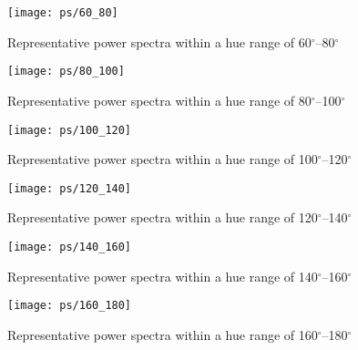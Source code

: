 \begin{figure}[p]
	{\vspace*{-0.5cm}\hspace*{-1.5cm}\texttt{[image: ps/60\_80]}}
	\caption[Power spectra with a hue of 60$^\circ$--80$^\circ$]{Representative power spectra within a hue range of 60$^\circ$--80$^\circ$}\label{fig:ps_60_80}
\end{figure}

\begin{figure}[p]
	{\vspace*{-0.5cm}\hspace*{-1.5cm}\texttt{[image: ps/80\_100]}}
	\caption[Power spectra with a hue of 80$^\circ$--100$^\circ$]{Representative power spectra within a hue range of 80$^\circ$--100$^\circ$}\label{fig:ps_80_100}
\end{figure}

\begin{figure}[p]
	{\vspace*{-0.5cm}\hspace*{-1.5cm}\texttt{[image: ps/100\_120]}}
	\caption[Power spectra with a hue of 100$^\circ$--120$^\circ$]{Representative power spectra within a hue range of 100$^\circ$--120$^\circ$}\label{fig:ps_100_120}
\end{figure}

\begin{figure}[p]
	{\vspace*{-0.5cm}\hspace*{-1.5cm}\texttt{[image: ps/120\_140]}}
	\caption[Power spectra with a hue of 120$^\circ$--140$^\circ$]{Representative power spectra within a hue range of 120$^\circ$--140$^\circ$}\label{fig:ps_120_140}
\end{figure}

\begin{figure}[p]
	{\vspace*{-0.5cm}\hspace*{-1.5cm}\texttt{[image: ps/140\_160]}}
	\caption[Power spectra with a hue of 140$^\circ$--160$^\circ$]{Representative power spectra within a hue range of 140$^\circ$--160$^\circ$}\label{fig:ps_140_160}
\end{figure}

\begin{figure}[p]
	{\vspace*{-0.5cm}\hspace*{-1.5cm}\texttt{[image: ps/160\_180]}}
	\caption[Power spectra with a hue of 160$^\circ$--180$^\circ$]{Representative power spectra within a hue range of 160$^\circ$--180$^\circ$}\label{fig:ps_160_180}
\end{figure}

